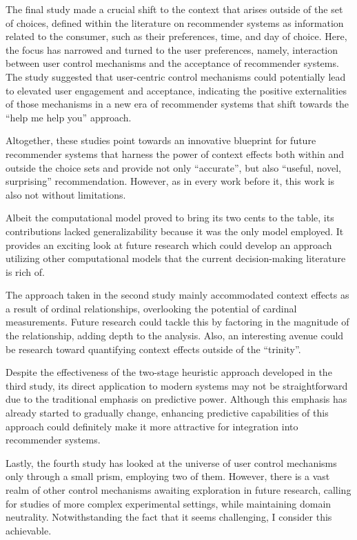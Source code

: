 \documentclass[a4paper,12pt]{article}
\begin{document}
The final study made a crucial shift to the context that arises outside of the set of choices, defined within the literature on recommender systems as information related to the consumer, such as their preferences, time, and day of choice. Here, the focus has narrowed and turned to the user preferences, namely, interaction between user control mechanisms and the acceptance of recommender systems. The study suggested that user-centric control mechanisms could potentially lead to elevated user engagement and acceptance, indicating the positive externalities of those mechanisms in a new era of recommender systems that shift towards the ``help me help you'' approach.

Altogether, these studies point towards an innovative blueprint for future recommender systems that harness the power of context effects both within and outside the choice sets and provide not only ``accurate'', but also ``useful, novel, surprising'' recommendation. However, as in every work before it, this work is also not without limitations.

Albeit the computational model proved to bring its two cents to the table, its contributions lacked generalizability because it was the only model employed. It provides an exciting look at future research which could develop an approach utilizing other computational models that the current decision-making literature is rich of. 

The approach taken in the second study mainly accommodated context effects as a result of ordinal relationships, overlooking the potential of cardinal measurements. Future research could tackle this by factoring in the magnitude of the relationship, adding depth to the analysis. Also, an interesting avenue could be research toward quantifying context effects outside of the ``trinity''. 

Despite the effectiveness of the two-stage heuristic approach developed in the third study, its direct application to modern systems may not be straightforward due to the traditional emphasis on predictive power. Although this emphasis has already started to gradually change, enhancing predictive capabilities of this approach could definitely make it more attractive for integration into recommender systems.

Lastly, the fourth study has looked at the universe of user control mechanisms only through a small prism, employing two of them. However, there is a vast realm of other control mechanisms awaiting exploration in future research, calling for studies of more complex experimental settings, while maintaining domain neutrality. Notwithstanding the fact that it seems challenging, I consider this achievable.
\end{document}
